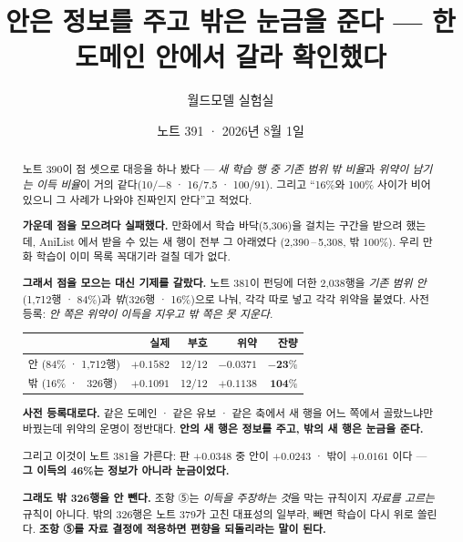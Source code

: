 \documentclass[11pt]{article}
\begin{document}
\title{안은 정보를 주고 밖은 눈금을 준다 --- 한 도메인 안에서 갈라 확인했다}
\author{월드모델 실험실}
\date{노트 391 · 2026년 8월 1일}
\maketitle

\begin{abstract}
노트 390이 점 셋으로 대응을 하나 봤다 --- \emph{새 학습 행 중 기존 범위
밖 비율}과 \emph{위약이 남기는 이득 비율}이 거의 같다(10/$-8$ · 16/7.5 ·
100/91). 그리고 ``16\%와 100\% 사이가 비어 있으니 그 사례가 나와야 진짜인지
안다''고 적었다.

\textbf{가운데 점을 모으려다 실패했다.} 만화에서 학습 바닥(5,306)을 걸치는
구간을 받으려 했는데, AniList 에서 받을 수 있는 새 행이 전부 그 아래였다
(2,390\,--\,5,308, 밖 100\%). 우리 만화 학습이 이미 목록 꼭대기라 걸칠 데가
없다.

\textbf{그래서 점을 모으는 대신 기제를 갈랐다.} 노트 381이 펀딩에 더한
2,038행을 \emph{기존 범위 안}(1,712행 · 84\%)과 \emph{밖}(326행 · 16\%)으로
나눠, 각각 따로 넣고 각각 위약을 붙였다. 사전 등록: \emph{안 쪽은 위약이
이득을 지우고 밖 쪽은 못 지운다.}

\begin{center}
\begin{tabular}{lrrrr}
\hline
 & 실제 & 부호 & 위약 & 잔량 \\
\hline
안 (84\% · 1,712행) & $+0.1582$ & 12/12 & $\mathbf{-0.0371}$ & $\mathbf{-23\%}$ \\
밖 (16\% · \,\,\,326행) & $+0.1091$ & 12/12 & $\mathbf{+0.1138}$ & $\mathbf{104\%}$ \\
\hline
\end{tabular}
\end{center}

\textbf{사전 등록대로다.} 같은 도메인 · 같은 유보 · 같은 축에서 새 행을
어느 쪽에서 골랐느냐만 바꿨는데 위약의 운명이 정반대다. \textbf{안의 새 행은
정보를 주고, 밖의 새 행은 눈금을 준다.}

그리고 이것이 노트 381을 가른다: 판 $+0.0348$ 중 안이 $+0.0243$ · 밖이
$+0.0161$ 이다 --- \textbf{그 이득의 46\%는 정보가 아니라 눈금이었다.}

\textbf{그래도 밖 326행을 안 뺀다.} 조항 ⑤는 \emph{이득을 주장하는 것}을
막는 규칙이지 \emph{자료를 고르는} 규칙이 아니다. 밖의 326행은 노트 379가
고친 대표성의 일부라, 빼면 학습이 다시 위로 쏠린다. \textbf{조항 ⑤를 자료
결정에 적용하면 편향을 되돌리라는 말이 된다.}
\end{abstract}
\end{document}
